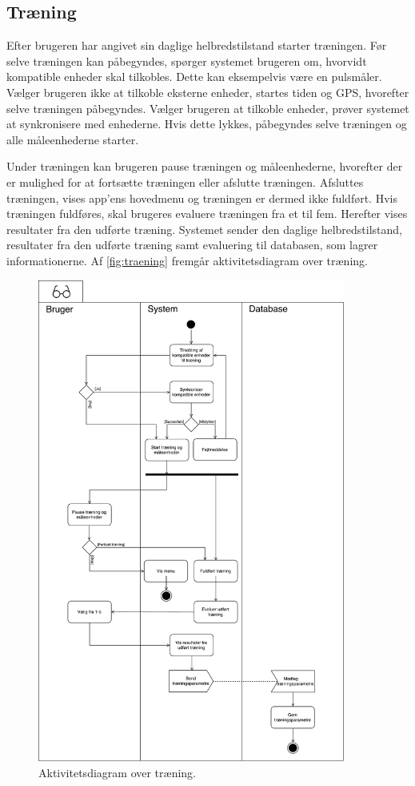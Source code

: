 \subsection{Træning}
Efter brugeren har angivet sin daglige helbredstilstand starter træningen. Før selve træningen kan påbegyndes, spørger systemet brugeren om, hvorvidt kompatible enheder skal tilkobles. Dette kan eksempelvis være en pulsmåler. Vælger brugeren ikke at tilkoble eksterne enheder, startes tiden og GPS, hvorefter selve træningen påbegyndes. Vælger brugeren at tilkoble enheder, prøver systemet at synkronisere med enhederne.  Hvis dette lykkes, påbegyndes selve træningen og alle måleenhederne starter.

Under træningen kan brugeren pause træningen og måleenhederne, hvorefter der er mulighed for at fortsætte træningen eller afslutte træningen. Afsluttes træningen, vises app'ens hovedmenu og træningen er dermed ikke fuldført. 
Hvis træningen fuldføres, skal brugeres evaluere træningen fra et til fem. Herefter vises resultater fra den udførte træning. Systemet sender den daglige helbredstilstand, resultater fra den udførte træning samt evaluering til databasen, som lagrer informationerne. 
Af \autoref{fig:traening} fremgår aktivitetsdiagram over træning.

\begin{figure} [H]
\centering
\includegraphics[width=0.9\textwidth]{figures/aktivitetsdiagram/Traening}
\caption{Aktivitetsdiagram over træning.}
\label{fig:traening}
\end{figure}
